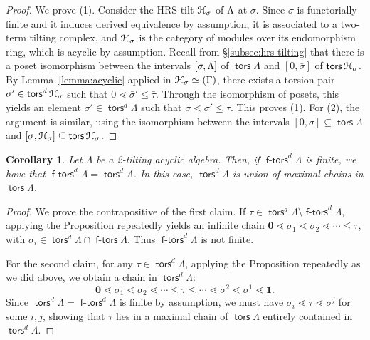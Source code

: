 \documentclass[a4paper,11pt]{amsart}
\theoremstyle{plain}
\newtheorem{cor}[thm]{Corollary}
\theoremstyle{definition}
\DeclareMathOperator{\ftors}{\mathsf{f-tors}}
\DeclareMathOperator{\tors}{\mathsf{tors}}
\let\mod\relax
\DeclareMathOperator{\mod}{\mathsf{mod}}
\begin{document}
\begin{proof}
	We prove (1). Consider the HRS-tilt
	$\mathcal{H}_\sigma$ of $\mod\Lambda$ at $\sigma$.
	Since $\sigma$ is functorially
	finite and it induces derived equivalence by assumption, it is associated to a
	two-term tilting complex, and $\mathcal{H}_\sigma$ is the category of modules over its
	endomorphism ring, which is acyclic by assumption.
	Recall from
	\S\ref{subsec:hrs-tilting} that there is a poset isomorphism between the
	intervals $[\sigma,\mod \Lambda]$ of $\tors\Lambda$ and $[0,\bar\sigma]$ of
	$\tors\Hcal_\sigma$. By Lemma~\ref{lemma:acyclic} applied in
	$\Hcal_\sigma\simeq\mod(\Gamma)$, there
	exists a torsion pair $\bar\sigma'\in\tors^d\Hcal_\sigma$ such that
	$0\lessdot\bar\sigma'\leq \bar \tau$. Through the isomorphism of posets, this
	yields an element $\sigma'\in\tors^d\Lambda$ such that $\sigma\lessdot\sigma'\leq
	\tau$. This proves (1). For (2), the argument is similar, using the isomorphism between the intervals
	$[0,\sigma]\subseteq\tors\Lambda$ and
	$[\bar\sigma,\Hcal_\sigma]\subseteq\tors\Hcal_\sigma$.
\end{proof}

\begin{cor}\label{cor:dij-derived}
	Let $\Lambda$ be a 2-tilting acyclic algebra. Then, if
	$\ftors^d\Lambda$ is finite, we have that $\ftors^d\Lambda=\tors^d\Lambda$. In
	this case, $\tors^d\Lambda$ is union of maximal chains in $\tors\Lambda$.
\end{cor}

\begin{proof}
	We prove the contrapositive of the first claim. If
	$\tau\in\tors^d\Lambda\setminus\ftors^d\Lambda$,
	applying the Proposition repeatedly yields an infinite chain $\mathbf{0}\lessdot
	\sigma_1\lessdot\sigma_2\lessdot\cdots\leq \tau$, with
	$\sigma_i\in\tors^d\Lambda\cap\ftors\Lambda$. Thus $\ftors^d\Lambda$ is not
	finite.

	For the second claim, for any $\tau\in\tors^d\Lambda$, applying the Proposition
	repeatedly as we did above, we obtain a chain in $\tors^d\Lambda$:
	\[\mathbf{0}\lessdot \sigma_1\lessdot\sigma_2\lessdot\cdots\leq \tau\leq\cdots
	\lessdot\sigma^2\lessdot\sigma^1\lessdot\mathbf{1}.\]
	Since $\tors^d\Lambda=\ftors^d\Lambda$ is finite by assumption, we must have
	$\sigma_i\lessdot \tau\lessdot \sigma^j$ for some $i,j$, showing that $\tau$
	lies in a maximal chain of $\tors\Lambda$ entirely contained in
	$\tors^d\Lambda$.
\end{proof}
\end{document}
